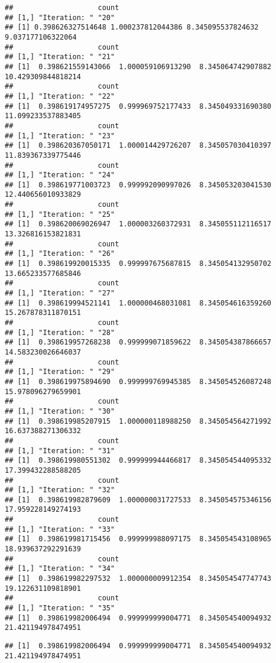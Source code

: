 \documentclass[
]{article}
\begin{document}
\begin{verbatim}
##                    count
## [1,] "Iteration: " "20" 
## [1] 0.398626327514648 1.000237812044386 8.345095537824632 9.037177106322064
##                    count
## [1,] "Iteration: " "21" 
## [1]  0.398621559143066  1.000059106913290  8.345064742907882 10.429309844818214
##                    count
## [1,] "Iteration: " "22" 
## [1]  0.398619174957275  0.999969752177433  8.345049331690380 11.099233537883405
##                    count
## [1,] "Iteration: " "23" 
## [1]  0.398620367050171  1.000014429726207  8.345057030410397 11.839367339775446
##                    count
## [1,] "Iteration: " "24" 
## [1]  0.398619771003723  0.999992090997026  8.345053203041530 12.440656010933829
##                    count
## [1,] "Iteration: " "25" 
## [1]  0.398620069026947  1.000003260372931  8.345055112116517 13.326816153821831
##                    count
## [1,] "Iteration: " "26" 
## [1]  0.398619920015335  0.999997675687815  8.345054132950702 13.665233577685846
##                    count
## [1,] "Iteration: " "27" 
## [1]  0.398619994521141  1.000000468031081  8.345054616359260 15.267878311870151
##                    count
## [1,] "Iteration: " "28" 
## [1]  0.398619957268238  0.999999071859622  8.345054387866657 14.583230026646037
##                    count
## [1,] "Iteration: " "29" 
## [1]  0.398619975894690  0.999999769945385  8.345054526087248 15.978096279659901
##                    count
## [1,] "Iteration: " "30" 
## [1]  0.398619985207915  1.000000118988250  8.345054564271992 16.637388271306332
##                    count
## [1,] "Iteration: " "31" 
## [1]  0.398619980551302  0.999999944466817  8.345054544095332 17.399432288588205
##                    count
## [1,] "Iteration: " "32" 
## [1]  0.398619982879609  1.000000031727533  8.345054575346156 17.959228149274193
##                    count
## [1,] "Iteration: " "33" 
## [1]  0.398619981715456  0.999999988097175  8.345054543108965 18.939637292291639
##                    count
## [1,] "Iteration: " "34" 
## [1]  0.398619982297532  1.000000009912354  8.345054547747743 19.122631109818901
##                    count
## [1,] "Iteration: " "35" 
## [1]  0.398619982006494  0.999999999004771  8.345054540094932 21.421194978474951
\end{verbatim}

\begin{verbatim}
## [1]  0.398619982006494  0.999999999004771  8.345054540094932 21.421194978474951
\end{verbatim}
\end{document}
